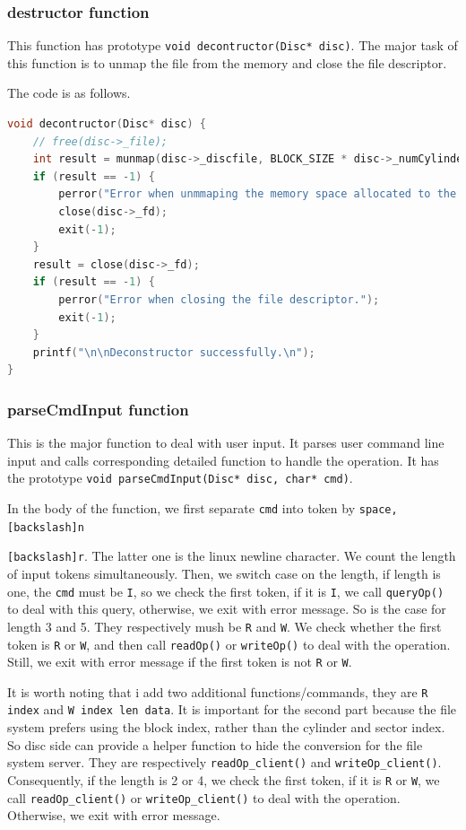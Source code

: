 \subsubsection{destructor function}
This function has prototype \texttt{void decontructor(Disc* disc)}.
The major task of this function is to unmap the file from the memory and close the file descriptor.

The code is as follows.

\begin{lstlisting}[language=C]
    void decontructor(Disc* disc) {
    // free(disc->_file);
    int result = munmap(disc->_discfile, BLOCK_SIZE * disc->_numCylinder * disc->_numSectorPerCylinder);
    if (result == -1) {
        perror("Error when unmmaping the memory space allocated to the file.");
        close(disc->_fd);
        exit(-1);
    }
    result = close(disc->_fd);
    if (result == -1) {
        perror("Error when closing the file descriptor.");
        exit(-1);
    }
    printf("\n\nDeconstructor successfully.\n");
}
\end{lstlisting}

\subsubsection{parseCmdInput function}
This is the major function to deal with user input.
It parses user command line input and calls corresponding detailed function to handle the operation.
It has the prototype \texttt{void parseCmdInput(Disc* disc, char* cmd)}.

In the body of the function, we first separate \texttt{cmd} into token by \texttt{space, [backslash]n}

\texttt{[backslash]r}. The latter one 
is the linux newline character. We count the length of input tokens simultaneously. 
Then, we switch case on the length, if length is one, the \texttt{cmd} must be \texttt{I}, so we check 
the first token, if it is \texttt{I}, we call \texttt{queryOp()} to deal with this query, otherwise, we exit with error message.
So is the case for length 3 and 5. They respectively mush be \texttt{R} and \texttt{W}. We check whether 
the first token is \texttt{R} or \texttt{W}, and then call \texttt{readOp()} or \texttt{writeOp()} to deal with the operation.
Still, we exit with error message if the first token is not \texttt{R} or \texttt{W}.

It is worth noting that i add two additional functions/commands, they are \texttt{R index} and \texttt{W index len data}.
It is important for the second part because the file system prefers using the block index, rather than the cylinder and sector index.
So disc side can provide a helper function to hide the conversion for the file system server. They are respectively \texttt{readOp\_client()} and \texttt{writeOp\_client()}.
Consequently, if the length is 2 or 4, we check the first token, if it is \texttt{R} or \texttt{W}, we call \texttt{readOp\_client()} or \texttt{writeOp\_client()} to deal with the operation.
Otherwise, we exit with error message.

